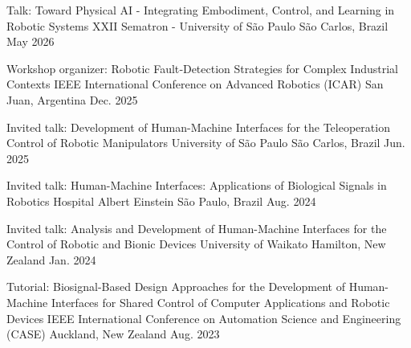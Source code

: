 \begin{cventries}
  \cventry
    {Talk: Toward Physical AI - Integrating Embodiment, Control, and Learning in Robotic Systems} %
    {XXII Sematron - University of São Paulo} %
    {São Carlos, Brazil} %
    {May 2026} %
    {}
\vspace{-20pt} 



  \cventry
    {Workshop organizer: Robotic Fault‑Detection Strategies for Complex Industrial Contexts} %
    {IEEE International Conference on Advanced Robotics (ICAR)} %
    {San Juan, Argentina} %
    {Dec. 2025} %
    {}
\vspace{-20pt} 


  \cventry
    {Invited talk: Development of Human-Machine Interfaces for the Teleoperation Control of Robotic Manipulators} %
    {University of São Paulo} %
    {São Carlos, Brazil} %
    {Jun. 2025} %
    {}
\vspace{-20pt} 

  \cventry
    {Invited talk: Human-Machine Interfaces: Applications of Biological Signals in Robotics} %
    {Hospital Albert Einstein} %
    {São Paulo, Brazil} %
    {Aug. 2024} %
    {}
\vspace{-20pt} 



  \cventry
    {Invited talk: Analysis and Development of Human-Machine Interfaces for the Control of Robotic and Bionic Devices} %
    {University of Waikato} %
    {Hamilton, New Zealand} %
    {Jan. 2024} %
    {}
\vspace{-20pt} 




  \cventry
    {Tutorial: Biosignal-Based Design Approaches for the Development of Human-Machine Interfaces for Shared Control of Computer Applications and Robotic Devices} %
    {IEEE International Conference on Automation Science and Engineering (CASE)} %
    {Auckland, New Zealand} %
    {Aug. 2023} %
    {}
\vspace{-20pt}


\end{cventries}